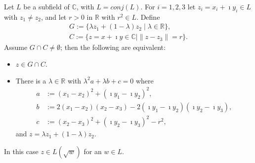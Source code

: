 \begin{lemma}
    \label{lem:ConjClosed.Intersection_line_circle}
    Let $L$ be a subfield of $\mathbb{C}$, with $L = conj(L)$. For $i = 1,2,3$ let $z_i = x_i + \imath y_i \in L$ with $z_1 \ne z_2$, and let $r > 0$ in $\mathbb{R}$ with $r^2 \in L$. Define
    \begin{equation*}\begin{aligned}
        G := \{\lambda z_1 + (1-\lambda)z_2 \mid \lambda \in \mathbb{R}\},\\
        C := \{z = x + \imath y \in \mathbb{C} \mid \|z - z_3\| = r\}.
    \end{aligned} \end{equation*}
    Assume $G \cap C \ne \emptyset$; then the following are equivalent:
    \begin{itemize}
        \item $z\in G \cap C$.
        \item There is a $\lambda \in \mathbb{R}$ with $\lambda^2 a+ \lambda b + c = 0$ where
        \begin{align*}
            a &:= (x_1 - x_2)^2 + (\imath y_1 - \imath y_2)^2,\\
            b &:= 2(x_1 - x_2)(x_2 - x_3) - 2(\imath y_1 - \imath y_2)(\imath y_2 - \imath y_3),\\
            c &:= (x_2 - x_3)^2 + (\imath y_2 - \imath y_3)^2 - r^2,
        \end{align*}
        and $z = \lambda z_1 + (1-\lambda)z_2$.
    \end{itemize}
    In this case $z \in L(\sqrt{w})$ for an $w \in L$.
\end{lemma}

